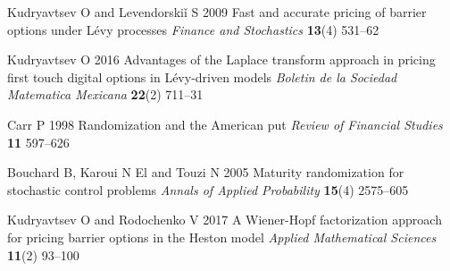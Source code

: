 \documentclass[a4paper]{jpconf}
\begin{document}
\begin{thebibliography}{18}
 Kudryavtsev O and Levendorski\v{i} S 2009 Fast and accurate pricing of barrier options under L\'evy processes {\it Finance and Stochastics} {\bf 13}(4) 531--62

 Kudryavtsev O 2016 Advantages of the Laplace transform approach in pricing first touch digital options in L\'evy-driven models {\it Boletin de la Sociedad Matematica Mexicana} {\bf 22}(2) 711--31

 Carr P 1998 Randomization and the American put {\it Review of Financial Studies} {\bf 11} 597--626

 Bouchard B, Karoui N El and Touzi N 2005 Maturity randomization for stochastic control problems  {\it Annals of Applied Probability} {\bf 15}(4) 2575--605

 Kudryavtsev O and Rodochenko V 2017 A Wiener-Hopf factorization approach for pricing barrier options in the Heston model {\it Applied Mathematical Sciences} {\bf 11}(2) 93--100

\end{thebibliography}
\end{document}
